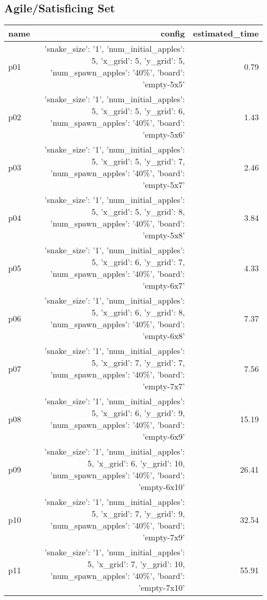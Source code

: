 \documentclass{article}
\begin{document}
                                \subsection*{Agile/Satisficing Set}
                                
                            \begin{center}
                            \scriptsize
                            \begin{tabular}{@{}l|r|r@{}}
                            name & config & estimated\_time\\\midrule
                              p01&{'snake\_size': '1', 'num\_initial\_apples': 5, 'x\_grid': 5, 'y\_grid': 5, 'num\_spawn\_apples': '40\%', 'board': 'empty-5x5'}&0.79\\
  p02&{'snake\_size': '1', 'num\_initial\_apples': 5, 'x\_grid': 5, 'y\_grid': 6, 'num\_spawn\_apples': '40\%', 'board': 'empty-5x6'}&1.43\\
  p03&{'snake\_size': '1', 'num\_initial\_apples': 5, 'x\_grid': 5, 'y\_grid': 7, 'num\_spawn\_apples': '40\%', 'board': 'empty-5x7'}&2.46\\
  p04&{'snake\_size': '1', 'num\_initial\_apples': 5, 'x\_grid': 5, 'y\_grid': 8, 'num\_spawn\_apples': '40\%', 'board': 'empty-5x8'}&3.84\\
  p05&{'snake\_size': '1', 'num\_initial\_apples': 5, 'x\_grid': 6, 'y\_grid': 7, 'num\_spawn\_apples': '40\%', 'board': 'empty-6x7'}&4.33\\
  p06&{'snake\_size': '1', 'num\_initial\_apples': 5, 'x\_grid': 6, 'y\_grid': 8, 'num\_spawn\_apples': '40\%', 'board': 'empty-6x8'}&7.37\\
  p07&{'snake\_size': '1', 'num\_initial\_apples': 5, 'x\_grid': 7, 'y\_grid': 7, 'num\_spawn\_apples': '40\%', 'board': 'empty-7x7'}&7.56\\
  p08&{'snake\_size': '1', 'num\_initial\_apples': 5, 'x\_grid': 6, 'y\_grid': 9, 'num\_spawn\_apples': '40\%', 'board': 'empty-6x9'}&15.19\\
  p09&{'snake\_size': '1', 'num\_initial\_apples': 5, 'x\_grid': 6, 'y\_grid': 10, 'num\_spawn\_apples': '40\%', 'board': 'empty-6x10'}&26.41\\
  p10&{'snake\_size': '1', 'num\_initial\_apples': 5, 'x\_grid': 7, 'y\_grid': 9, 'num\_spawn\_apples': '40\%', 'board': 'empty-7x9'}&32.54\\
  p11&{'snake\_size': '1', 'num\_initial\_apples': 5, 'x\_grid': 7, 'y\_grid': 10, 'num\_spawn\_apples': '40\%', 'board': 'empty-7x10'}&55.91\\

\end{tabular}
\end{center}
\end{document}
